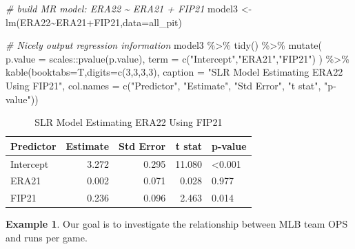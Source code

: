 \documentclass[
  11pt,
]{book}
\newenvironment{Shaded}{\begin{snugshade}}{\end{snugshade}}
\newcommand{\AttributeTok}[1]{\textcolor[rgb]{0.77,0.63,0.00}{#1}}
\newcommand{\CommentTok}[1]{\textcolor[rgb]{0.56,0.35,0.01}{\textit{#1}}}
\newcommand{\DecValTok}[1]{\textcolor[rgb]{0.00,0.00,0.81}{#1}}
\newcommand{\FunctionTok}[1]{\textcolor[rgb]{0.00,0.00,0.00}{#1}}
\newcommand{\NormalTok}[1]{#1}
\newcommand{\OtherTok}[1]{\textcolor[rgb]{0.56,0.35,0.01}{#1}}
\newcommand{\SpecialCharTok}[1]{\textcolor[rgb]{0.00,0.00,0.00}{#1}}
\newcommand{\StringTok}[1]{\textcolor[rgb]{0.31,0.60,0.02}{#1}}
\theoremstyle{definition}
\theoremstyle{definition}
\newtheorem{example}{Example}[chapter]
\theoremstyle{definition}
\theoremstyle{definition}
\theoremstyle{remark}
\begin{document}
\begin{Shaded}
\begin{Highlighting}[]
\CommentTok{\# build MR model: ERA22 \textasciitilde{} ERA21 + FIP21}
\NormalTok{model3 }\OtherTok{\textless{}{-}} \FunctionTok{lm}\NormalTok{(ERA22}\SpecialCharTok{\textasciitilde{}}\NormalTok{ERA21}\SpecialCharTok{+}\NormalTok{FIP21,}\AttributeTok{data=}\NormalTok{all\_pit)}

\CommentTok{\# Nicely output regression information}
\NormalTok{model3 }\SpecialCharTok{\%\textgreater{}\%} \FunctionTok{tidy}\NormalTok{() }\SpecialCharTok{\%\textgreater{}\%}
  \FunctionTok{mutate}\NormalTok{(}
    \AttributeTok{p.value =}\NormalTok{ scales}\SpecialCharTok{::}\FunctionTok{pvalue}\NormalTok{(p.value),}
    \AttributeTok{term =} \FunctionTok{c}\NormalTok{(}\StringTok{"Intercept"}\NormalTok{,}\StringTok{"ERA21"}\NormalTok{,}\StringTok{"FIP21"}\NormalTok{)}
\NormalTok{  ) }\SpecialCharTok{\%\textgreater{}\%}
  \FunctionTok{kable}\NormalTok{(}\AttributeTok{booktabs=}\NormalTok{T,}\AttributeTok{digits=}\FunctionTok{c}\NormalTok{(}\DecValTok{3}\NormalTok{,}\DecValTok{3}\NormalTok{,}\DecValTok{3}\NormalTok{,}\DecValTok{3}\NormalTok{), }
        \AttributeTok{caption =} \StringTok{"SLR Model Estimating ERA22 Using FIP21"}\NormalTok{,}
        \AttributeTok{col.names =} \FunctionTok{c}\NormalTok{(}\StringTok{"Predictor"}\NormalTok{, }\StringTok{"Estimate"}\NormalTok{, }\StringTok{"Std Error"}\NormalTok{, }\StringTok{"t stat"}\NormalTok{, }\StringTok{"p{-}value"}\NormalTok{))}
\end{Highlighting}
\end{Shaded}

\begin{table}

\caption{\label{tab:unnamed-chunk-222}SLR Model Estimating ERA22 Using FIP21}
\centering
\begin{tabular}[t]{lrrrl}
\toprule
Predictor & Estimate & Std Error & t stat & p-value\\
\midrule
Intercept & 3.272 & 0.295 & 11.080 & <0.001\\
ERA21 & 0.002 & 0.071 & 0.028 & 0.977\\
FIP21 & 0.236 & 0.096 & 2.463 & 0.014\\
\bottomrule
\end{tabular}
\end{table}

\newpage

\begin{example}
Our goal is to investigate the relationship between MLB team OPS and runs per game.
\end{example}
\end{document}
